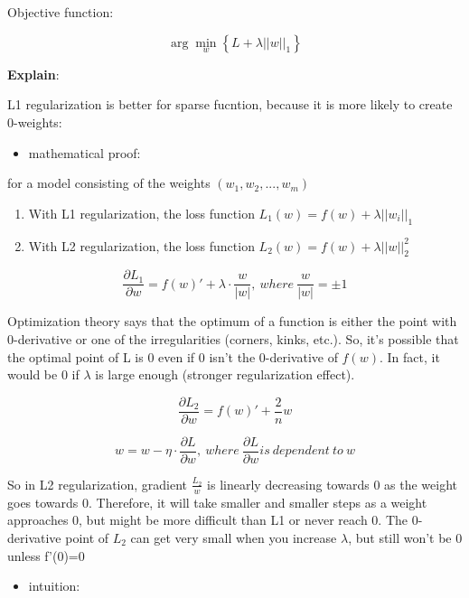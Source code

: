 \documentclass[11pt]{article}
\providecommand{\tightlist}{%
      \setlength{\itemsep}{0pt}\setlength{\parskip}{0pt}}
\begin{document}
\noindent Objective function:

\[\arg \min _w \left \{ L + \lambda ||w||_1 \right \}\]

\noindent \textbf{Explain}:

 L1 regularization is better for sparse fucntion, because it is
more likely to create 0-weights:


\begin{itemize}
\tightlist
\item
  mathematical proof:
\end{itemize}

for a model consisting of the weights \((w_1,w_2,...,w_m)\)

\begin{enumerate}
\def\labelenumi{\arabic{enumi}.}
\item
  With L1 regularization, the loss function
  \(L_1(w) = f(w) + \lambda||w_i||_1\)
\item
  With L2 regularization, the loss function
  \(L_2(w) = f(w) +\lambda ||w||^2_2\)
\end{enumerate}



\[\frac{\partial L_1}{\partial w} = f(w)' + \lambda \cdot \frac{w}{|w|}, \: where \: \frac{w}{|w|} = \pm 1\]

Optimization theory says that the optimum of a function is either the point with 0-derivative or one of the irregularities (corners, kinks, etc.). So, it's possible that the optimal point of L is 0 even if 0 isn't the 0-derivative of \(f(w)\). In fact, it would be 0 if \(\lambda\) is large enough (stronger regularization effect). 

\[\frac{\partial L_2}{\partial w} = f(w)' + \frac{2}{n} w\]

\[w = w - \eta \cdot \frac{\partial L}{\partial w}, \: where \: \frac{\partial L}{\partial w}  is \: dependent \: to \: w\]

So in L2 regularization, gradient \(\frac{L_2}{w}\) is linearly
decreasing towards 0 as the weight goes towards 0. Therefore, it will
take smaller and smaller steps as a weight approaches 0, but might be
more difficult than L1 or never reach 0.
 The 0-derivative point of \(L_2\) can get very small when you increase \(\lambda\), but still won't be 0 unless  f'(0)=0

\begin{itemize}
\tightlist
\item
  intuition:
\end{itemize}
\end{document}
